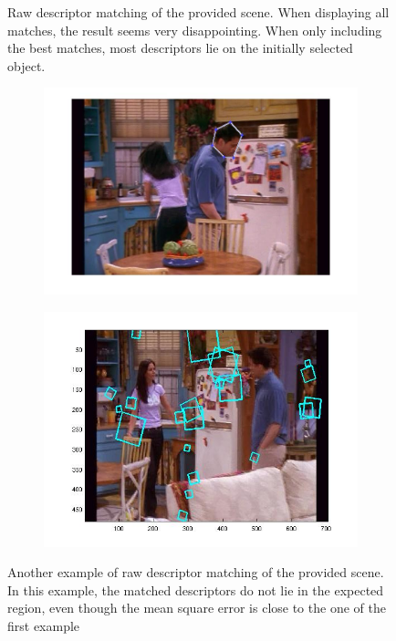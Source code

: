 \documentclass{paper}
\begin{document}
\begin{figure}
\begin{subfigure}[b]{0.7\textwidth}
  \end{subfigure}
\caption{Raw descriptor matching of the provided scene. When displaying all matches,
the result seems very disappointing. When only including the best matches, most 
descriptors lie on the initially selected object.}
\label{fig:raw_desc_match}
\end{figure}
\begin{figure}
  \centering
  \begin{subfigure}[b]{0.7\textwidth}
    \includegraphics[width=\textwidth]{raw_fail_selection}
  \end{subfigure}
  \begin{subfigure}[b]{0.7\textwidth}
    \includegraphics[width=\textwidth]{raw_fail_all}
  \end{subfigure}
\caption{Another example of raw descriptor matching of the provided scene.
In this example, the matched descriptors do not lie in the expected region, even though
the mean square error is close to the one of the first example}
\label{fig:raw_fail}
\end{figure}
\end{document}
